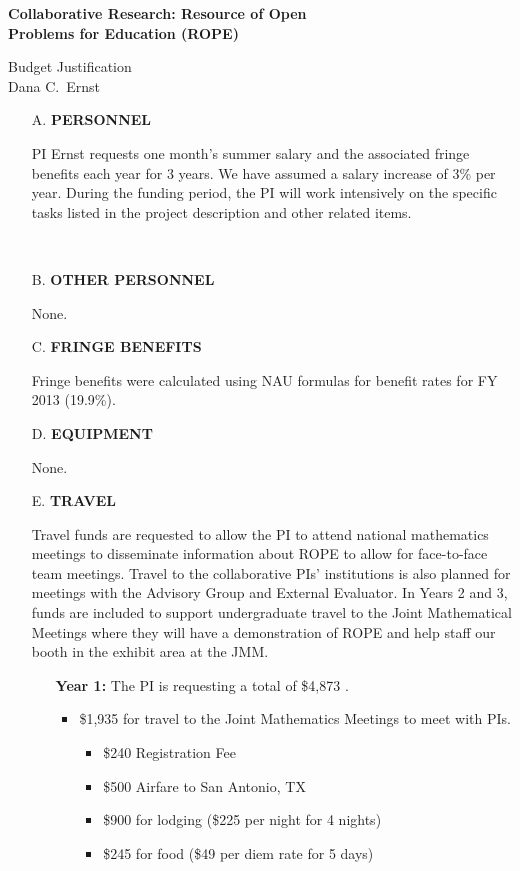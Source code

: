 \documentclass[11pt]{article}
\begin{document}
\begin{center}
{\Large \textbf{Collaborative Research: Resource of Open\\
Problems for Education (ROPE)}}

\bigskip

{\Large Budget Justification}\\
\smallskip
Dana C.~Ernst
\end{center}

\begin{enumerate}[leftmargin=*]

\item[A.] \textbf{PERSONNEL}

PI Ernst requests one month's summer salary and the associated fringe benefits each year for 3 years. We have assumed a salary increase of 3\% per year.  During the funding period, the PI will work intensively on the specific tasks listed in the project description and other related items. 

\ \hfill {}

\item[B.] \textbf{OTHER PERSONNEL}

None. \hfill {}

\item[C.] \textbf{FRINGE BENEFITS}

Fringe benefits were calculated using NAU formulas for benefit rates for FY 2013 (19.9\%).

\hfill {}

\item[D.] \textbf{EQUIPMENT}

None. \hfill {}

\item[E.] \textbf{TRAVEL}

Travel funds are requested to allow the PI to attend national mathematics meetings to disseminate information about ROPE to allow for face-to-face team meetings.  Travel to the collaborative PIs' institutions is also planned for meetings with the Advisory Group and External Evaluator. In Years 2 and 3, funds are included to support undergraduate travel to the Joint Mathematical Meetings where they will have a demonstration of ROPE and help staff our booth in the exhibit area at the JMM.

\begin{enumerate}
\item[] \textbf{Year 1:} The PI is requesting a total of \$4,873 .
\begin{itemize}
\item \$1,935 for travel to the Joint Mathematics Meetings to meet with PIs.
\begin{itemize}
\item \$240 Registration Fee
\item \$500 Airfare to San Antonio, TX
\item \$900 for lodging (\$225 per night for 4 nights)
\item \$245 for food (\$49 per diem rate for 5 days)
\end{itemize}


\end{itemize}
\end{enumerate}
\end{enumerate}
\end{document}

